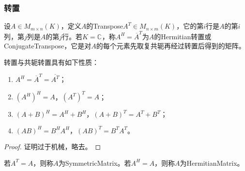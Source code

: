 \subsubsection{转置}
\begin{definition}
	设$A\in M_{m\times n}(K)$，定义$A$的\gls{Transpose}$A^T\in M_{n\times m}(K)$，它的第$i$行是$A$的第$i$列，第$j$列是$A$的第$j$行。若$K=\mathbb{C}^{}$，称$A^H=\overline{A}^T$为$A$的Hermitian转置或\gls{ConjugateTranspose}，它是对$A$的每个元素先取复共轭再经过转置后得到的矩阵。
\end{definition}
\begin{property}\label{prop:Transpose}
	转置与共轭转置具有如下性质：
	\begin{enumerate}
		\item $A^H=\overline{A}^T=\overline{A^T}$；
		\item $(A^H)^H=A$，$(A^T)^T=A$；
		\item $(A+B)^H=A^H+B^H$，$(A+B)^T=A^T+B^T$；
		\item $(AB)^H=B^HA^H$，$(AB)^T=B^TA^T$。
	\end{enumerate}
\end{property}
\begin{proof}
	证明过于机械，略去。
\end{proof}
\begin{definition}
	若$A^T=A$，则称$A$为\gls{SymmetricMatrix}。若$A^H=A$，则称$A$为\gls{HermitianMatrix}。
\end{definition}
